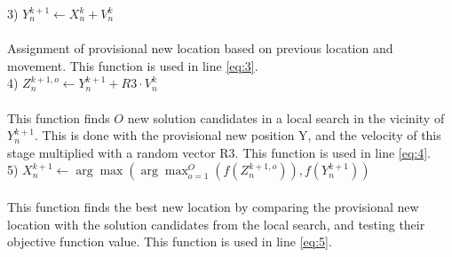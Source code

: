 \documentclass[runningheads]{llncs}
\begin{document}
3) $
Y_n^{k+1} \leftarrow X_n^k + V_n^k
$ \\ \\
Assignment of provisional new location based on previous location and movement. This function is used in line \ref{eq:3}. \\ 

4) $
Z_n^{k+1, o} \leftarrow Y_n^{k+1} + R3 \cdot V_n^{k}
$ \\ \\
This function finds $O$ new solution candidates in a local search in the vicinity of $Y_n^{k+1}$. This is done with the provisional new position Y, and the velocity of this stage multiplied with a random vector R3. This function is used in line \ref{eq:4}.\\

5) $
X_n^{k+1} \leftarrow \arg \max (\arg \max_{o=1}^O(f(Z_n^{k+1, o})),f(Y_n^{k+1}))
$ \\ \\
This function finds the best new location by comparing the provisional new location with the solution candidates from the local search, and testing their objective function value. This function is used in line \ref{eq:5}.



\newpage
\end{document}

